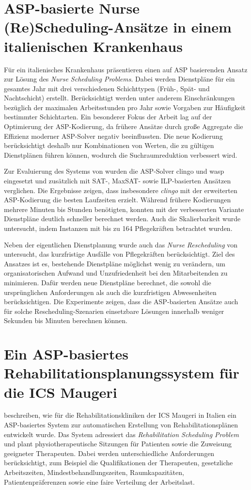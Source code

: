 \section{ASP-basierte Nurse (Re)Scheduling-Ansätze in einem italienischen Krankenhaus}
Für ein italienisches Krankenhaus präsentieren \textcite{alvianoNurseReschedulingAnswer2019} einen auf ASP basierenden Ansatz zur Lösung des \textit{Nurse Scheduling Problems}. Dabei werden Dienstpläne für ein gesamtes Jahr mit drei verschiedenen Schichttypen (Früh-, Spät- und Nachtschicht) erstellt. Berücksichtigt werden unter anderem Einschränkungen bezüglich der maximalen Arbeitsstunden pro Jahr sowie Vorgaben zur Häufigkeit bestimmter Schichtarten. Ein besonderer Fokus der Arbeit lag auf der Optimierung der ASP-Kodierung, da frühere Ansätze durch große Aggregate die Effizienz moderner ASP-Solver negativ beeinflussten. Die neue Kodierung berücksichtigt deshalb nur Kombinationen von Werten, die zu gültigen Dienstplänen führen können, wodurch die Suchraumreduktion verbessert wird.

Zur Evaluierung des Systems von \textcite{alvianoNurseReschedulingAnswer2019} wurden die ASP-Solver clingo und wasp eingesetzt und zusätzlich mit SAT-, MaxSAT- sowie ILP-basierten Ansätzen verglichen. Die Ergebnisse zeigen, dass insbesondere \textit{clingo} mit der erweiterten ASP-Kodierung die besten Laufzeiten erzielt. Während frühere Kodierungen mehrere Minuten bis Stunden benötigten, konnten mit der verbesserten Variante Dienstpläne deutlich schneller berechnet werden. Auch die Skalierbarkeit wurde untersucht, indem Instanzen mit bis zu 164 Pflegekräften betrachtet wurden.

Neben der eigentlichen Dienstplanung wurde auch das \textit{Nurse Rescheduling} von \textcite{alvianoNurseReschedulingAnswer2019} untersucht, das kurzfristige Ausfälle von Pflegekräften berücksichtigt. Ziel des Ansatzes ist es, bestehende Dienstpläne möglichst wenig zu verändern, um organisatorischen Aufwand und Unzufriedenheit bei den Mitarbeitenden zu minimieren. Dafür werden neue Dienstpläne berechnet, die sowohl die ursprünglichen Anforderungen als auch die kurzfristigen Abwesenheiten berücksichtigen. Die Experimente zeigen, dass die ASP-basierten Ansätze auch für solche Rescheduling-Szenarien einsetzbare Lösungen innerhalb weniger Sekunden bis Minuten berechnen können.

\section{Ein ASP-basiertes Rehabilitationsplanungssystem für die ICS Maugeri}
\textcite{cardellini2023solvingrehabilitationschedulingproblems} beschreiben, wie für die Rehabilitationskliniken der ICS Maugeri in Italien ein ASP-basiertes System zur automatischen Erstellung von Rehabilitationsplänen entwickelt wurde. Das System adressiert das \textit{Rehabilitation Scheduling Problem} und plant physiotherapeutische Sitzungen für Patienten sowie die Zuweisung geeigneter Therapeuten. Dabei werden unterschiedliche Anforderungen berücksichtigt, zum Beispiel die Qualifikationen der Therapeuten, gesetzliche Arbeitszeiten, Mindestbehandlungszeiten, Raumkapazitäten, Patientenpräferenzen sowie eine faire Verteilung der Arbeitslast.

